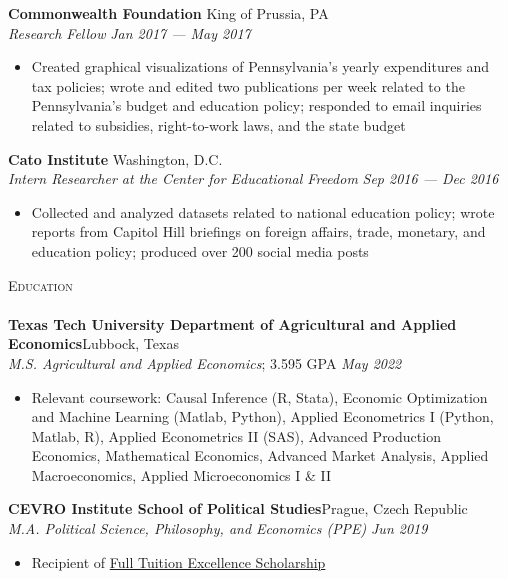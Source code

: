 \documentclass[a4paper,11pt]{article}
\newcommand{\lineunder} {
    \vspace*{-8pt} \\
    \hspace*{-18pt} \hrulefill \\
}
\newcommand{\header} [1] {
    {\hspace*{-18pt}\vspace*{6pt} \textsc{\large{#1}}}
    \vspace*{-6pt} \lineunder
}
\begin{document}
\textbf{Commonwealth Foundation} \hfill \faMapMarker\space King of Prussia, PA\\
\textit{Research Fellow} \hfill  \emph{Jan 2017 --- May 2017}\\
\begin{itemize}
    \item Created graphical visualizations of Pennsylvania's yearly expenditures and tax policies; wrote and edited two publications per week related to the Pennsylvania's budget and education policy; responded to email inquiries related to subsidies, right-to-work laws, and the state budget
\end{itemize}

\textbf{Cato Institute} \hfill \faMapMarker\space Washington, D.C.\\
\textit{Intern Researcher at the Center for Educational Freedom} \hfill  \emph{Sep 2016 --- Dec 2016}\\
\begin{itemize}
    \item Collected and analyzed datasets related to national education policy; wrote reports from Capitol Hill briefings on foreign affairs, trade, monetary, and education policy; produced over 200 social media posts 
\end{itemize}
\vspace{1mm}

\header{Education}
\textbf{Texas Tech University Department of Agricultural and Applied Economics}\hfill \faMapMarker\space Lubbock, Texas\\
\textit{M.S. Agricultural and Applied Economics}; 3.595 GPA \hfill  \emph{May 2022} \\
\begin{itemize}
    \item Relevant coursework: Causal Inference (R, Stata), Economic Optimization and Machine Learning (Matlab, Python), Applied Econometrics I (Python, Matlab, R), Applied Econometrics II (SAS), Advanced Production Economics, Mathematical Economics, Advanced Market Analysis, Applied Macroeconomics, Applied Microeconomics I \& II
\end{itemize}

\textbf{CEVRO Institute School of Political Studies}\hfill \faMapMarker\space Prague, Czech Republic\\
\textit{M.A. Political Science, Philosophy, and Economics (PPE)} \hfill  \emph{Jun 2019}\\
\begin{itemize}
    \item Recipient of \href{http://www.cevroinstitut.cz/en/article/scholarships/}{Full Tuition Excellence Scholarship}
\end{itemize}
\end{document}
